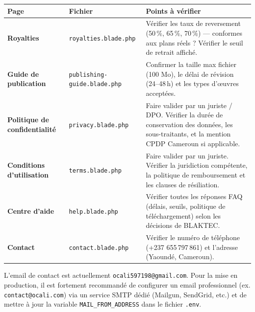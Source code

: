 \documentclass[12pt,a4paper]{article}
\newcommand{\warn}{\textcolor{OrangeOCaLi}{\ding{115}}}
\begin{document}
\begin{tabularx}{\linewidth}{>{\bfseries}p{3.8cm} p{4.2cm} X}
  \toprule
  \textbf{Page} & \textbf{Fichier} & \textbf{Points à vérifier} \\
  \midrule
  \rowcolor{GrisClair}
  Royalties & \texttt{royalties.blade.php} &
    Vérifier les taux de reversement (50\,\%, 65\,\%, 70\,\%) — conformes aux plans réels ? Vérifier le seuil de retrait affiché. \\

  Guide de publication & \texttt{publishing-guide.blade.php} &
    Confirmer la taille max fichier (100 Mo), le délai de révision (24–48\,h) et les types d'œuvres acceptées. \\

  \rowcolor{GrisClair}
  Politique de confidentialité & \texttt{privacy.blade.php} &
    Faire valider par un juriste / DPO. Vérifier la durée de conservation des données, les sous-traitants, et la mention CPDP Cameroun si applicable. \\

  Conditions d'utilisation & \texttt{terms.blade.php} &
    Faire valider par un juriste. Vérifier la juridiction compétente, la politique de remboursement et les clauses de résiliation. \\

  \rowcolor{GrisClair}
  Centre d'aide & \texttt{help.blade.php} &
    Vérifier toutes les réponses FAQ (délais, seuils, politique de téléchargement) selon les décisions de BLAKTEC. \\

  Contact & \texttt{contact.blade.php} &
    Vérifier le numéro de téléphone (+237 655\,797\,861) et l'adresse (Yaoundé, Cameroun). \\
  \bottomrule
\end{tabularx}

\vspace{1em}

\begin{alertbox}[{\warn\ Email de contact}]
L'email de contact est actuellement \texttt{ocali597198@gmail.com}.
Pour la mise en production, il est fortement recommandé de configurer un email professionnel
(ex. \texttt{contact@ocali.com}) via un service SMTP dédié (Mailgun, SendGrid, etc.)
et de mettre à jour la variable \texttt{MAIL\_FROM\_ADDRESS} dans le fichier \texttt{.env}.
\end{alertbox}

\end{document}
